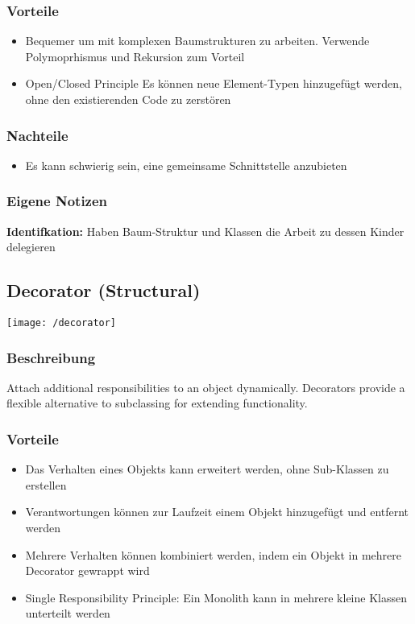 \subsubsection{Vorteile}
\begin{itemize}[topsep=0pt]
    \itemsep -0.4em
    \item Bequemer um mit komplexen Baumstrukturen zu arbeiten. Verwende Polymoprhismus und Rekursion zum Vorteil
    \item Open/Closed Principle Es können neue Element-Typen hinzugefügt werden, ohne den existierenden Code zu zerstören
\end{itemize}
\subsubsection{Nachteile}
\begin{itemize}[topsep=0pt]
    \itemsep -0.4em
    \item Es kann schwierig sein, eine gemeinsame Schnittstelle anzubieten
\end{itemize}
\subsubsection{Eigene Notizen}
\textbf{Identifkation:} Haben Baum-Struktur und Klassen die Arbeit zu dessen Kinder delegieren

\subsection{Decorator (Structural)}
\texttt{[image: /decorator]}
\subsubsection{Beschreibung}
Attach additional responsibilities to an object dynamically. Decorators provide a flexible alternative to subclassing for extending functionality.
\subsubsection{Vorteile}
\begin{itemize}[topsep=0pt]
    \itemsep -0.4em
    \item Das Verhalten eines Objekts kann erweitert werden, ohne Sub-Klassen zu erstellen
    \item Verantwortungen können zur Laufzeit einem Objekt hinzugefügt und entfernt werden
    \item Mehrere Verhalten können kombiniert werden, indem ein Objekt in mehrere Decorator gewrappt wird
    \item Single Responsibility Principle: Ein Monolith kann in mehrere kleine Klassen unterteilt werden
\end{itemize}
